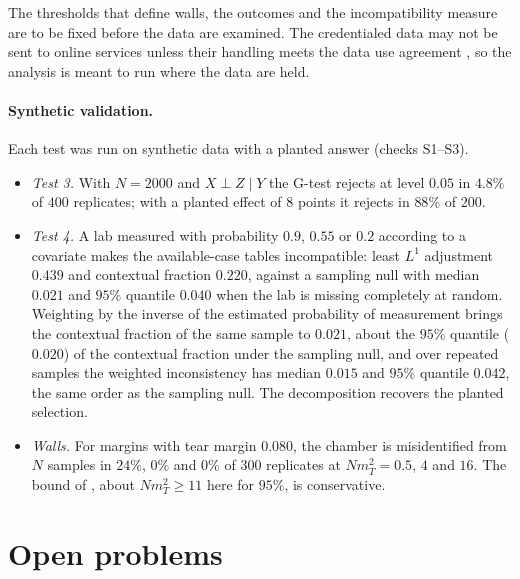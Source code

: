 \documentclass[11pt]{article}
\theoremstyle{definition}
\theoremstyle{remark}
\begin{document}
The thresholds that define walls, the outcomes and the incompatibility measure are to be fixed before the data are examined. The
credentialed data may not be sent to online services unless their handling meets the data use agreement \cite{PhysioNetLLM}, so the
analysis is meant to run where the data are held.

\paragraph{Synthetic validation.} Each test was run on synthetic data with a planted answer (checks S1--S3).
\begin{itemize}[leftmargin=*,nosep]
\item \emph{Test 3.} With $N=2000$ and $X\perp Z\mid Y$ the G-test rejects at level $0.05$ in $4.8\%$ of $400$ replicates; with a planted
  effect of $8$ points it rejects in $88\%$ of $200$.
\item \emph{Test 4.} A lab measured with probability $0.9$, $0.55$ or $0.2$ according to a covariate makes the available-case tables
  incompatible: least $L^1$ adjustment $0.439$ and contextual fraction $0.220$, against a sampling null with median $0.021$ and
  $95\%$ quantile $0.040$ when the lab is missing completely at random. Weighting by the inverse of the estimated probability of
  measurement brings the contextual fraction of the same sample to $0.021$, about the $95\%$ quantile ($0.020$) of the contextual
  fraction under the sampling null, and over repeated samples the weighted inconsistency has median $0.015$ and $95\%$ quantile
  $0.042$, the same order as the sampling null. The decomposition recovers the planted selection.
\item \emph{Walls.} For margins with tear margin $0.080$, the chamber is misidentified from $N$ samples in $24\%$, $0\%$ and $0\%$ of
  $300$ replicates at $Nm_T^2=0.5$, $4$ and $16$. The bound of \cite[Prop.~12.2]{Conditionals}, about $Nm_T^2\ge11$ here for $95\%$, is
  conservative.
\end{itemize}

\section{Open problems}\label{sec:open}
\end{document}
